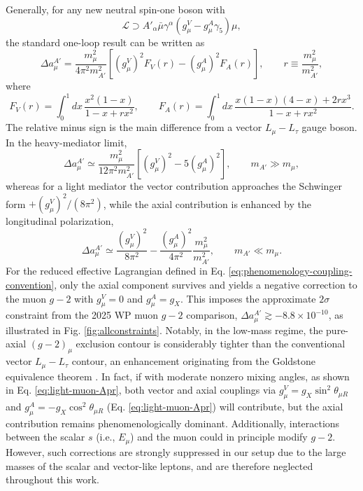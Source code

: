 \documentclass[onecolumn, aps, nofootinbib, prd, preprint, floats, floatfix, amsmath, amssymb, superscriptaddress, preprintnumbers]{revtex4-2}
\begin{document}
Generally, for any new neutral spin-one boson with
\begin{equation}
\mathcal L\supset
A'_\alpha\bar\mu\gamma^\alpha
\left(g_\mu^V-g_\mu^A\gamma_5\right)\mu ,
\end{equation}
the standard one-loop result can be written as \cite{Leveille:1977rc,Davoudiasl:2014kua,Anastasopoulos:2022ywj}
\begin{equation}
\Delta a_\mu^{A'}=
\frac{m_\mu^2}{4\pi^2m_{A'}^2}
\left[
(g_\mu^V)^2F_V(r)
-(g_\mu^A)^2F_A(r)
\right],
\qquad
r\equiv \frac{m_\mu^2}{m_{A'}^2},
\label{eq:gminus2-vector-axial}
\end{equation}
where
\begin{equation}
F_V(r)=\int_0^1 dx\,
\frac{x^2(1-x)}{1-x+r x^2},
\qquad
F_A(r)=\int_0^1 dx\,
\frac{x(1-x)(4-x)+2r x^3}{1-x+r x^2}.
\label{eq:gminus2-FV-FA}
\end{equation}
The relative minus sign is the main difference from a vector $L_\mu-L_\tau$ gauge boson. In the heavy-mediator limit,
\begin{equation}
\Delta a_\mu^{A'}\simeq
\frac{m_\mu^2}{12\pi^2m_{A'}^2}
\left[(g_\mu^V)^2-5(g_\mu^A)^2\right],
\qquad m_{A'}\gg m_\mu ,
\label{eq:gminus2-heavy-limit}
\end{equation}
whereas for a light mediator the vector contribution approaches the Schwinger form $+(g_\mu^V)^2/(8\pi^2)$, while the axial contribution is enhanced by the longitudinal polarization,
\begin{equation}
\Delta a_\mu^{A'}\simeq
\frac{(g_\mu^V)^2}{8\pi^2}
-\frac{(g_\mu^A)^2}{4\pi^2}\frac{m_\mu^2}{m_{A'}^2},
\qquad m_{A'}\ll m_\mu .
\label{eq:gminus2-light-limit}
\end{equation}
For the reduced effective Lagrangian defined in Eq. \eqref{eq:phenomenology-coupling-convention}, only the axial component survives and yields a negative correction to the muon $g-2$ with $g_\mu^V=0$ and $g_\mu^A=g_X$. This imposes the approximate $2\sigma$ constraint from the 2025 WP muon $g-2$ comparison, $\Delta a_\mu^{A'} \gtrsim -8.8\times10^{-10}$, as illustrated in Fig. \ref{fig:allconstraints}.
Notably, in the low-mass regime, the pure-axial $(g-2)_\mu$ exclusion contour is considerably tighter than the conventional vector $L_\mu-L_\tau$ contour, an enhancement originating from the Goldstone equivalence theorem \cite{Fayet:2020nyx,Dror:2017nsg,Biggio:2016wyy}. 
In fact, if with moderate nonzero mixing angles, as shown in Eq. \eqref{eq:light-muon-Apr}, both vector and axial couplings via $g_\mu^V=g_X \sin^2\theta_{\mu R}$ and $g_\mu^A=-g_X \cos^2\theta_{\mu R}$ (Eq. \eqref{eq:light-muon-Apr}) will contribute, but the axial contribution remains phenomenologically dominant.
Additionally, interactions between the scalar $s$ (i.e., $E_\mu$) and the muon could in principle modify $g-2$. However, such corrections are strongly suppressed in our setup due to the large masses of the scalar and vector-like leptons, and are therefore neglected throughout this work.
\end{document}
